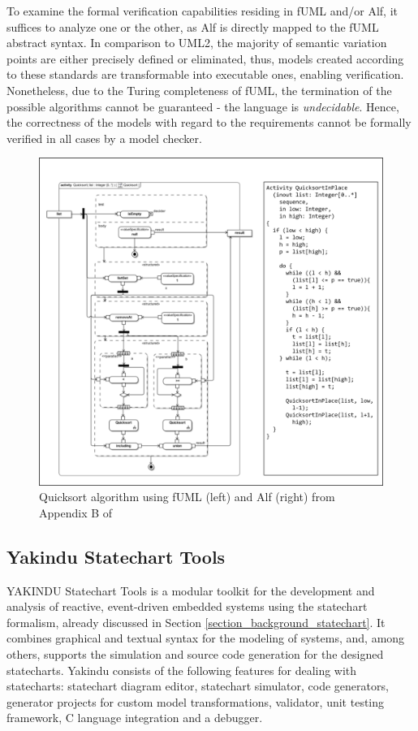 To examine the formal verification capabilities residing in fUML and/or Alf, it suffices to analyze one or the other, as Alf is directly mapped to the fUML abstract syntax. In comparison to UML2, the majority of semantic variation points are either precisely defined or eliminated, thus, models created according to these standards are transformable into executable ones, enabling verification. Nonetheless, due to the Turing completeness of fUML, the termination of the possible algorithms cannot be guaranteed - the language is \textit{undecidable}. Hence, the correctness of the models with regard to the requirements cannot be formally verified in all cases by a model checker.

\begin{figure}[H]
	\centering
	\includegraphics[width=140mm, keepaspectratio]{figures/AlfQuicksort.png}
	\caption{Quicksort algorithm using fUML (left) and Alf (right) from Appendix B of \cite{AlfStandard}}
	\label{fig:AlfQuicksort}
\end{figure}

\subsection{Yakindu Statechart Tools} \label{subsection_background_comparison_Yakindu}
YAKINDU Statechart Tools is a modular toolkit for the development and analysis of reactive, event-driven embedded systems using the statechart formalism, already discussed in Section \ref{section_background_statechart}. It combines graphical and textual syntax for the modeling of systems, and, among others, supports the simulation and source code generation for the designed statecharts. Yakindu consists of the following features for dealing with statecharts: statechart diagram editor, statechart simulator, code generators, generator projects for custom model transformations, validator, unit testing framework, C language integration and a debugger.


